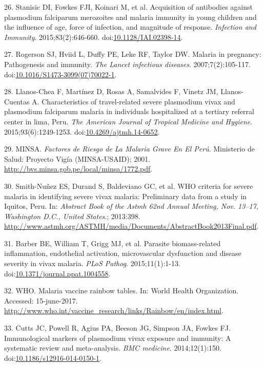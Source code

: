 \documentclass[a4paper]{article}
\begin{document}
\hypertarget{ref-Stanisic2015}{}
26. Stanisic DI, Fowkes FJI, Koinari M, et al. Acquisition of antibodies
against plasmodium falciparum merozoites and malaria immunity in young
children and the influence of age, force of infection, and magnitude of
response. \emph{Infection and Immunity}. 2015;83(2):646-660.
doi:\href{https://doi.org/10.1128/IAI.02398-14}{10.1128/IAI.02398-14}.

\hypertarget{ref-rogerson2007preg}{}
27. Rogerson SJ, Hviid L, Duffy PE, Leke RF, Taylor DW. Malaria in
pregnancy: Pathogenesis and immunity. \emph{The Lancet infectious
diseases}. 2007;7(2):105-117.
doi:\href{https://doi.org/10.1016/S1473-3099(07)70022-1}{10.1016/S1473-3099(07)70022-1}.

\hypertarget{ref-llanoschea2015}{}
28. Llanos-Chea F, Martínez D, Rosas A, Samalvides F, Vinetz JM,
Llanos-Cuentas A. Characteristics of travel-related severe plasmodium
vivax and plasmodium falciparum malaria in individuals hospitalized at a
tertiary referral center in lima, Peru. \emph{The American Journal of
Tropical Medicine and Hygiene}. 2015;93(6):1249-1253.
doi:\href{https://doi.org/10.4269/ajtmh.14-0652}{10.4269/ajtmh.14-0652}.

\hypertarget{ref-factores2001}{}
29. MINSA. \emph{Factores de Riesgo de La Malaria Grave En El Perú}.
Ministerio de Salud: Proyecto Vigía (MINSA-USAID); 2001.
\url{http://bvs.minsa.gob.pe/local/minsa/1772.pdf}.

\hypertarget{ref-smith2013}{}
30. Smith-Nuñez ES, Durand S, Baldeviano GC, et al. WHO criteria for
severe malaria in identifying severe vivax malaria: Preliminary data
from a study in Iquitos, Peru. In: \emph{Abstract Book of the Astmh 62nd
Annual Meeting, Nov. 13--17, Washington D.C., United States}.; 2013:398.
\url{http://www.astmh.org/ASTMH/media/Documents/AbstractBook2013Final.pdf}.

\hypertarget{ref-barber2015}{}
31. Barber BE, William T, Grigg MJ, et al. Parasite biomass-related
inflammation, endothelial activation, microvascular dysfunction and
disease severity in vivax malaria. \emph{PLoS Pathog}. 2015;11(1):1-13.
doi:\href{https://doi.org/10.1371/journal.ppat.1004558}{10.1371/journal.ppat.1004558}.

\hypertarget{ref-rainbow2016}{}
32. WHO. Malaria vaccine rainbow tables. In: World Health Organization.
Accessed: 15-june-2017.
\url{http://www.who.int/vaccine_research/links/Rainbow/en/index.html}.

\hypertarget{ref-cutts2014meta}{}
33. Cutts JC, Powell R, Agius PA, Beeson JG, Simpson JA, Fowkes FJ.
Immunological markers of plasmodium vivax exposure and immunity: A
systematic review and meta-analysis. \emph{BMC medicine}.
2014;12(1):150.
doi:\href{https://doi.org/10.1186/s12916-014-0150-1}{10.1186/s12916-014-0150-1}.
\end{document}
